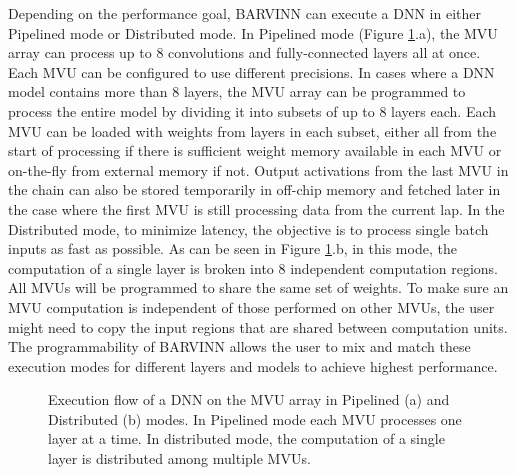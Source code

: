 \documentclass[sigconf]{acmart}
\newcommand{\MVU}{MVU}
\newcommand{\BARVINN}{BARVINN}
\newcommand{\Pito}{Pito: RISC-V-based Controller}
\newcommand{\sean}[1]{{\color{blue} #1}}
\begin{document}
Depending on the performance goal, \BARVINN{} can execute a DNN in either Pipelined mode or Distributed mode.
In Pipelined mode (Figure \ref{fig:mvu_laps}.a), the \MVU{} array can process up to 8 convolutions and fully-connected layers all at once. Each \MVU{} can be configured to use different precisions. In cases where a DNN model contains more than 8 layers, the \MVU{} array can be programmed to process the entire model by dividing it into subsets of up to 8 layers each. Each \MVU{} can be loaded with weights from layers in each subset, either all from the start of processing if there is sufficient weight memory available in each \MVU{} or on-the-fly from external memory if not. Output activations from the last \MVU{} in the chain can also be stored temporarily in off-chip memory and fetched later in the case where the first \MVU{} is still processing data from the current lap. 
In the Distributed mode, to minimize latency, the objective is to process single batch inputs as fast as possible. As can be seen in Figure \ref{fig:mvu_laps}.b, in this mode, the computation of a single layer is broken into 8 independent computation regions. All \MVU{}s will be programmed to share the same set of weights. To make sure an \MVU{} computation is independent of those performed on other  \MVU{}s, the user might need to copy the input regions that are shared between computation units. The programmability of \BARVINN{} allows the user to mix and match these execution modes for different layers and models to achieve highest performance.


\begin{figure}[!h]
  \centering
    \small
\caption{Execution flow of a DNN on the \MVU{} array in Pipelined (a) and Distributed (b) modes. In Pipelined mode each \MVU{} processes one layer at a time. In distributed mode, the computation of a single layer is distributed among multiple \MVU{}s.}
\label{fig:mvu_laps}
\vspace{-4mm}
\end{figure}

\end{document}
